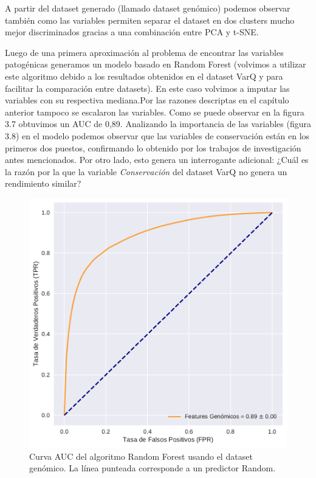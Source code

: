 A partir del dataset generado (llamado dataset genómico) podemos observar también como las variables permiten separar el dataset en dos clusters mucho mejor discriminados gracias a una combinación entre PCA y t-SNE.


Luego de una primera aproximación al problema de encontrar las variables patogénicas generamos un modelo basado en Random Forest (volvimos a utilizar este algoritmo debido a los resultados obtenidos en el dataset VarQ y para facilitar la comparación entre datasets). En este caso volvimos a imputar las variables con su respectiva mediana.Por las razones descriptas en el capítulo anterior tampoco se escalaron las variables. Como se puede observar en la figura 3.7 obtuvimos un AUC de 0,89. 
Analizando la importancia de las variables (figura 3.8) en el modelo podemos observar que las variables de conservación están en los primeros dos puestos, confirmando lo obtenido por los trabajos de investigación antes mencionados. Por otro lado, esto genera un interrogante adicional: ¿Cuál es la razón por la que la variable \textit{Conservación} del dataset VarQ no genera un rendimiento similar?


\begin{figure}[H]
    \centering
    \includegraphics[scale=0.55]{documents/latex/figures/3/auc_2.pdf}
    \caption{Curva AUC del algoritmo Random Forest usando el dataset genómico. La línea punteada corresponde a un predictor Random.}
    \label{fig:auc_2}
\end{figure}

